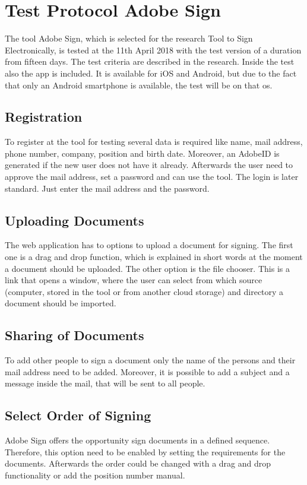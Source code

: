 \section{Test Protocol Adobe Sign}
\label{sec:adobesign}
The tool Adobe Sign, which is selected for the research Tool to Sign Electronically, is tested at the 11th April 2018 with the test version of a duration from fifteen days. The test criteria are described in the research. Inside the test also the \gls{app} is included. It is available for iOS and Android, but due to the fact that only an Android smartphone is available, the test will be on that \gls{os}.

\subsection{Registration}
To register at the tool for testing several data is required like name, mail address, phone number, company, position and birth date. Moreover, an AdobeID is generated if the new user does not have it already. Afterwards the user need to approve the mail address, set a password and can use the tool. The login is later standard. Just enter the mail address and the password.

\subsection{Uploading Documents}
The web application has to options to upload a document for signing. The first one is a drag and drop function, which is explained in short words at the moment a document should be uploaded. The other option is the file chooser. This is a link that opens a window, where the user can select from which source (computer, stored in the tool or from another cloud storage) and directory a document should be imported.

\subsection{Sharing of Documents}
To add other people to sign a document only the name of the persons and their mail address need to be added. Moreover, it is possible to add a subject and a message inside the mail, that will be sent to all people.

\subsection{Select Order of Signing}
Adobe Sign offers the opportunity sign documents in a defined sequence. Therefore, this option need to be enabled by setting the requirements for the documents. Afterwards the order could be changed with a drag and drop functionality or add the position number manual.

